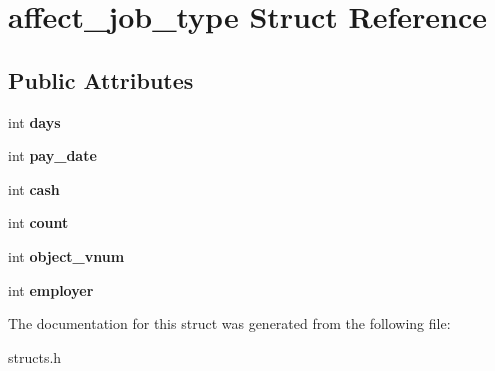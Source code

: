 \hypertarget{structaffect__job__type}{\section{affect\-\_\-job\-\_\-type Struct Reference}
\label{structaffect__job__type}
}
\subsection*{Public Attributes}
\begin{DoxyCompactItemize}
\item 
\hypertarget{structaffect__job__type_a7f3bb0af069978da2803c73c37c429c2}{int {\bfseries days}}\label{structaffect__job__type_a7f3bb0af069978da2803c73c37c429c2}

\item 
\hypertarget{structaffect__job__type_a209da486a69582e12db8acd4e0446f39}{int {\bfseries pay\-\_\-date}}\label{structaffect__job__type_a209da486a69582e12db8acd4e0446f39}

\item 
\hypertarget{structaffect__job__type_ad5345379577918f150a0d67f01423703}{int {\bfseries cash}}\label{structaffect__job__type_ad5345379577918f150a0d67f01423703}

\item 
\hypertarget{structaffect__job__type_ab2383ebbbb5807be4bfa65d62048b389}{int {\bfseries count}}\label{structaffect__job__type_ab2383ebbbb5807be4bfa65d62048b389}

\item 
\hypertarget{structaffect__job__type_ae82fa8285f26f550b485a6a19b9b9e13}{int {\bfseries object\-\_\-vnum}}\label{structaffect__job__type_ae82fa8285f26f550b485a6a19b9b9e13}

\item 
\hypertarget{structaffect__job__type_a982d2988dc92492858f84184bbc3ce35}{int {\bfseries employer}}\label{structaffect__job__type_a982d2988dc92492858f84184bbc3ce35}

\end{DoxyCompactItemize}


The documentation for this struct was generated from the following file\-:\begin{DoxyCompactItemize}
\item 
structs.\-h\end{DoxyCompactItemize}
